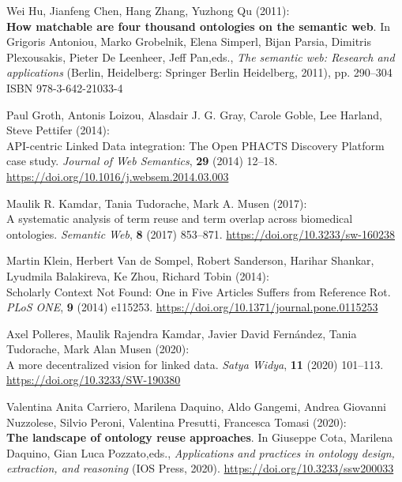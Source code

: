 \begin{thebibliography}{9}
Wei Hu, Jianfeng Chen, Hang Zhang, Yuzhong Qu (2011): \\
\textbf{How
matchable are four thousand ontologies on the semantic web}. In Grigoris
Antoniou, Marko Grobelnik, Elena Simperl, Bijan Parsia, Dimitris
Plexousakis, Pieter De Leenheer, Jeff Pan,eds., \emph{The semantic
web: {Research} and applications} ({Berlin, Heidelberg}: {Springer
Berlin Heidelberg}, 2011), pp. 290--304 ISBN 978-3-642-21033-4

Paul Groth, Antonis Loizou, Alasdair J. G. Gray, Carole Goble, Lee
Harland, Steve Pettifer (2014): \\
{API-centric Linked Data}
integration: {The Open PHACTS Discovery Platform} case study.
\emph{Journal of Web Semantics}, \textbf{29} (2014) 12--18.
\url{https://doi.org/10.1016/j.websem.2014.03.003}

Maulik R. Kamdar, Tania Tudorache, Mark A. Musen (2017): \\
A systematic
analysis of term reuse and term overlap across biomedical ontologies.
\emph{Semantic Web}, \textbf{8} (2017) 853--871.
\url{https://doi.org/10.3233/sw-160238}

Martin Klein, Herbert Van de Sompel, Robert Sanderson, Harihar Shankar,
Lyudmila Balakireva, Ke Zhou, Richard Tobin (2014): \\
Scholarly
{Context Not Found}: {One} in {Five Articles Suffers} from {Reference
Rot}. \emph{PLoS ONE}, \textbf{9} (2014) e115253.
\url{https://doi.org/10.1371/journal.pone.0115253}

Axel Polleres, Maulik Rajendra Kamdar, Javier David Fernández, Tania
Tudorache, Mark Alan Musen (2020): \\
A more decentralized vision for
linked data. \emph{Satya Widya}, \textbf{11} (2020) 101--113.
\url{https://doi.org/10.3233/SW-190380}

Valentina Anita Carriero, Marilena Daquino, Aldo Gangemi, Andrea
Giovanni Nuzzolese, Silvio Peroni, Valentina Presutti, Francesca
Tomasi (2020): \\
\textbf{The landscape of ontology reuse approaches}. In
Giuseppe Cota, Marilena Daquino, Gian Luca Pozzato,eds.,
\emph{Applications and practices in ontology design, extraction, and
reasoning} ({IOS Press}, 2020).
\url{https://doi.org/10.3233/ssw200033}


\end{thebibliography}
